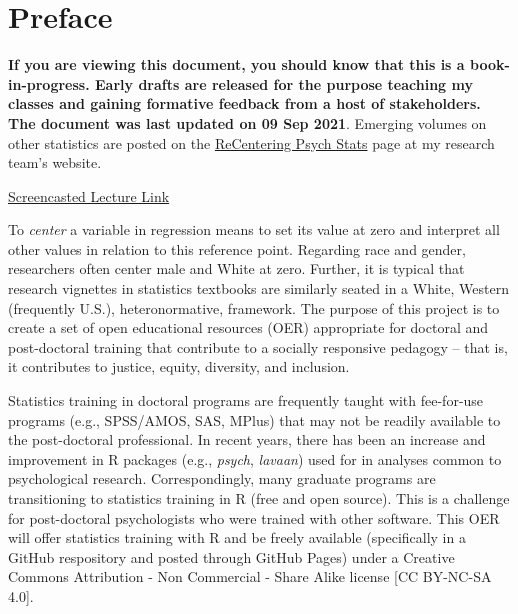 \documentclass[
  english,
]{book}
\begin{document}
\hypertarget{preface}{%
\chapter*{Preface}\label{preface}}

\textbf{If you are viewing this document, you should know that this is a book-in-progress. Early drafts are released for the purpose teaching my classes and gaining formative feedback from a host of stakeholders. The document was last updated on 09 Sep 2021}. Emerging volumes on other statistics are posted on the \href{https://lhbikos.github.io/BikosRVT/ReCenter.html}{ReCentering Psych Stats} page at my research team's website.

\href{https://spu.hosted.panopto.com/Panopto/Pages/Viewer.aspx?id=c932455e-ef06-444a-bdca-acf7012d759a}{Screencasted Lecture Link}

To \emph{center} a variable in regression means to set its value at zero and interpret all other values in relation to this reference point. Regarding race and gender, researchers often center male and White at zero. Further, it is typical that research vignettes in statistics textbooks are similarly seated in a White, Western (frequently U.S.), heteronormative, framework. The purpose of this project is to create a set of open educational resources (OER) appropriate for doctoral and post-doctoral training that contribute to a socially responsive pedagogy -- that is, it contributes to justice, equity, diversity, and inclusion.

Statistics training in doctoral programs are frequently taught with fee-for-use programs (e.g., SPSS/AMOS, SAS, MPlus) that may not be readily available to the post-doctoral professional. In recent years, there has been an increase and improvement in R packages (e.g., \emph{psych}, \emph{lavaan}) used for in analyses common to psychological research. Correspondingly, many graduate programs are transitioning to statistics training in R (free and open source). This is a challenge for post-doctoral psychologists who were trained with other software. This OER will offer statistics training with R and be freely available (specifically in a GitHub respository and posted through GitHub Pages) under a Creative Commons Attribution - Non Commercial - Share Alike license {[}CC BY-NC-SA 4.0{]}.
\end{document}
